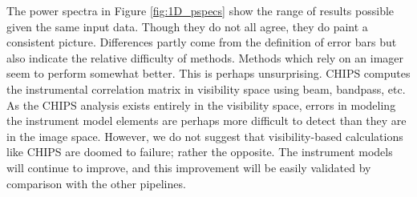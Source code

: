 \documentclass[twolcolumn]{emulateapj}
\begin{document}
The power spectra in Figure \ref{fig:1D_pspecs} show the range of results possible given the same input data. Though they do not all agree, they do paint a consistent picture.  Differences partly come from the definition of error bars but also indicate the relative difficulty of methods. Methods which rely on an imager seem to perform somewhat better. This is perhaps unsurprising. CHIPS computes the instrumental correlation matrix in visibility space using beam, bandpass, etc. As the CHIPS analysis exists entirely in the visibility space, errors in modeling the instrument model elements are perhaps more difficult to detect than they are in the image space.  However, we do not suggest that visibility-based calculations like CHIPS are doomed to failure; rather the opposite. The instrument models will continue to improve, and this improvement will be easily validated by comparison with the other pipelines.
\end{document}
